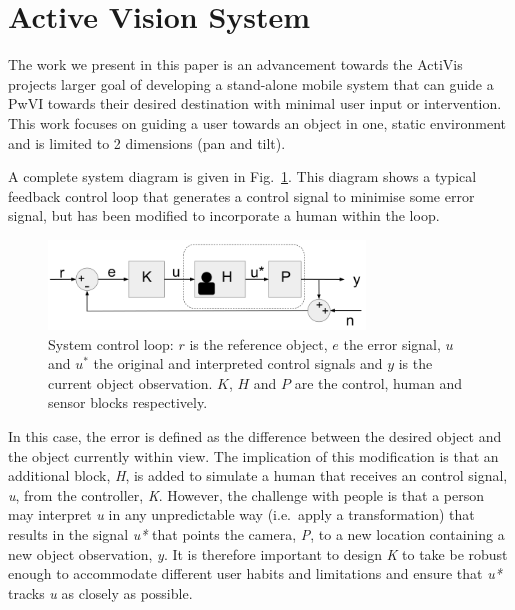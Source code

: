 \documentclass[runningheads]{llncs}
\newcommand\todo[1]{\textcolor{red}{#1}}
\begin{document}
\section{Active Vision System}\label{sec:active-vision}

The work we present in this paper is an advancement towards the ActiVis projects larger goal of developing a stand-alone mobile system that can guide a PwVI towards their desired destination with minimal user input or intervention. 
This work focuses on guiding a user towards an object in one, static environment and is limited to 2 dimensions (pan and tilt).

A complete system diagram is given in Fig.~\ref{fig:sys-diagram}. 
This diagram shows a typical feedback control loop that generates a control signal to minimise some error signal, but has been modified to incorporate a human within the loop.

\begin{figure}
  \centering
  \includegraphics[width=0.75\textwidth]{figures/control_loop.png}
  \caption{System control loop: $r$ is the reference object, $e$ the error signal, $u$ and $u^*$ the original and interpreted control signals and $y$ is the current object observation. $K$, $H$ and $P$ are the control, human and sensor blocks respectively. }\label{fig:sys-diagram}
\end{figure}

In this case, the error is defined as the difference between the desired object and the object currently within view. 
The implication of this modification is that an additional block, \emph{H}, is added to simulate a human that receives an control signal, \emph{u}, from the controller, \emph{K}. 
However, the challenge with people is that a person may interpret \emph{u} in any unpredictable way (i.e.\ apply a transformation) that results in the signal \emph{u*} that points the camera, \emph{P}, to a new location containing a new object observation, \emph{y}.
It is therefore important to design \emph{K} to take be robust enough to accommodate different user habits and limitations and ensure that \emph{u*} tracks \emph{u} as closely as possible. 
\end{document}
